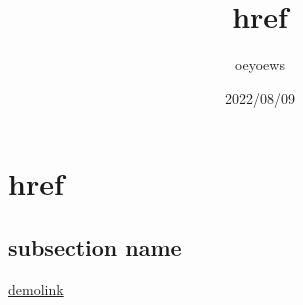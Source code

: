 \documentclass{article}
\title{href}
\author{oeyoews}
\date{2022/08/09}
\begin{document}
\maketitle


\section{href}

\subsection{subsection name}%

\href{https://oeyoew.fun}{demolink}
\end{document}
